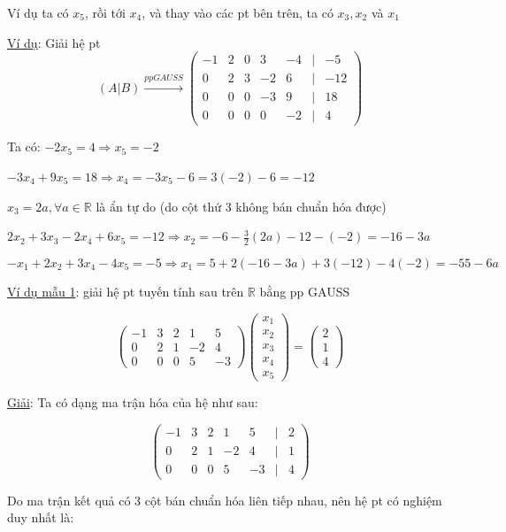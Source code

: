 \documentclass[12pt,a4paper]{article} \usepackage[utf8]{inputenc} \usepackage[T5]{fontenc} \usepackage[vietnamese]{babel} \usepackage{amsmath, amssymb, amsfonts} \usepackage{ulem}
\begin{document}
Ví dụ ta có $x_5$, rồi tới $x_4$, và thay vào các pt bên trên, ta có $x_3, x_2$ và $x_1$

\ul{Ví dụ}: Giải hệ pt
$$
(A|B) \xrightarrow{pp GAUSS} \begin{pmatrix} -1 & 2 & 0 & 3 & -4 & \big| & -5 \\ 0 & 2 & 3 & -2 & 6 & \big| & -12 \\ 0 & 0 & 0 & -3 & 9 & \big| & 18 \\ 0 & 0 & 0 & 0 & -2 & \big| & 4 \end{pmatrix}
$$

Ta có: $-2x_5 = 4 \Rightarrow x_5 = -2$

$-3x_4 + 9x_5 = 18 \Rightarrow x_4 = -3x_5 - 6 = 3(-2) - 6 = -12$

$x_3 = 2a, \forall a \in \mathbb{R}$ là ẩn tự do (do cột thứ 3 không bán chuẩn hóa được)

$2x_2 + 3x_3 - 2x_4 + 6x_5 = -12 \Rightarrow x_2 = -6 - \frac{3}{2}(2a) - 12 - (-2) = -16 - 3a$

$$
-x_1 + 2x_2 + 3x_4 - 4x_5 = -5 \Rightarrow x_1 = 5 + 2(-16 - 3a) + 3(-12) - 4(-2) = -55 - 6a
$$

\ul{Ví dụ mẫu 1}: giải hệ pt tuyến tính sau trên
$\mathbb{R}$ bằng pp GAUSS

$$
\begin{pmatrix} -1 & 3 & 2 & 1 & 5 \\ 0 & 2 & 1 & -2 & 4 \\ 0 & 0 & 0 & 5 & -3 \end{pmatrix} \begin{pmatrix} x_1 \\ x_2 \\ x_3 \\ x_4 \\ x_5 \end{pmatrix} = \begin{pmatrix} 2 \\ 1 \\ 4 \end{pmatrix}
$$

\ul{Giải}: Ta có dạng ma trận hóa của hệ như sau:

$$
\begin{pmatrix} -1 & 3 & 2 & 1 & 5 & \big| & 2 \\ 0 & 2 & 1 & -2 & 4 & \big| & 1 \\ 0 & 0 & 0 & 5 & -3 & \big| & 4 \end{pmatrix}
$$

Do ma trận kết quả có 3 cột bán chuẩn hóa liên tiếp nhau, nên hệ pt có nghiệm duy nhất là:
\end{document}
